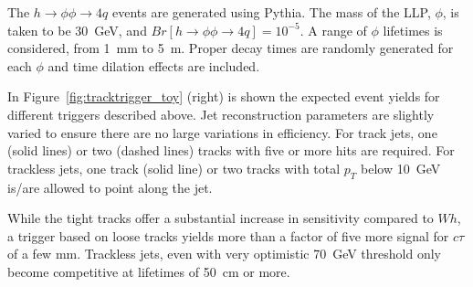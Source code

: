The $h\rightarrow\phi\phi\rightarrow 4q$ events are generated using Pythia. The mass of the LLP, $\phi$, is taken to be 30~GeV, and $Br[h\rightarrow\phi\phi\rightarrow 4q]=10^{-5}$. A range of $\phi$ lifetimes is considered, from 1~mm to 5~m. Proper decay times are randomly generated for each $\phi$ and time dilation effects are included.

In Figure~\ref{fig:tracktrigger_toy} (right) is shown the expected event yields for different triggers described above. Jet reconstruction parameters are slightly varied to ensure there are no large variations in efficiency. For track jets, one (solid lines) or two (dashed lines) tracks with five or more hits are required. For trackless jets, one track (solid line) or two tracks with total $p_T$ below 10~GeV is/are allowed to point along the jet.

While the tight tracks offer a substantial increase in sensitivity compared to $Wh$, a trigger based on loose tracks yields more than a factor of five more signal for $c\tau$ of a few mm. Trackless jets, even with very optimistic 70~GeV threshold only become competitive at lifetimes of 50~cm or more.

